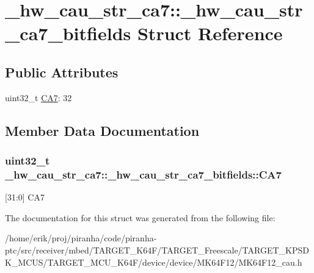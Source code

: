 \hypertarget{struct__hw__cau__str__ca7_1_1__hw__cau__str__ca7__bitfields}{}\section{\+\_\+hw\+\_\+cau\+\_\+str\+\_\+ca7\+:\+:\+\_\+hw\+\_\+cau\+\_\+str\+\_\+ca7\+\_\+bitfields Struct Reference}
\label{struct__hw__cau__str__ca7_1_1__hw__cau__str__ca7__bitfields}
\subsection*{Public Attributes}
\begin{DoxyCompactItemize}
\item 
uint32\+\_\+t \hyperlink{struct__hw__cau__str__ca7_1_1__hw__cau__str__ca7__bitfields_a9314cf28c14b49009a4653978e03c058}{C\+A7}\+: 32
\end{DoxyCompactItemize}


\subsection{Member Data Documentation}
\subsubsection[{\texorpdfstring{C\+A7}{CA7}}]{\setlength{\rightskip}{0pt plus 5cm}uint32\+\_\+t \+\_\+hw\+\_\+cau\+\_\+str\+\_\+ca7\+::\+\_\+hw\+\_\+cau\+\_\+str\+\_\+ca7\+\_\+bitfields\+::\+C\+A7}\hypertarget{struct__hw__cau__str__ca7_1_1__hw__cau__str__ca7__bitfields_a9314cf28c14b49009a4653978e03c058}{}\label{struct__hw__cau__str__ca7_1_1__hw__cau__str__ca7__bitfields_a9314cf28c14b49009a4653978e03c058}
\mbox{[}31\+:0\mbox{]} C\+A7 

The documentation for this struct was generated from the following file\+:\begin{DoxyCompactItemize}
\item 
/home/erik/proj/piranha/code/piranha-\/ptc/src/receiver/mbed/\+T\+A\+R\+G\+E\+T\+\_\+\+K64\+F/\+T\+A\+R\+G\+E\+T\+\_\+\+Freescale/\+T\+A\+R\+G\+E\+T\+\_\+\+K\+P\+S\+D\+K\+\_\+\+M\+C\+U\+S/\+T\+A\+R\+G\+E\+T\+\_\+\+M\+C\+U\+\_\+\+K64\+F/device/device/\+M\+K64\+F12/M\+K64\+F12\+\_\+cau.\+h\end{DoxyCompactItemize}
